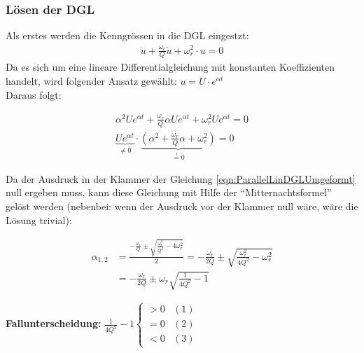 \subsubsection{Lösen der DGL}
Als erstes werden die Kenngrössen in die DGL eingestzt:
\begin{align}
\boxed{\ddot{u} + \frac{\omega_r}{Q}\dot{u} + \omega_r^2 \cdot u = 0}
\end{align}
Da es sich um eine lineare Differentialgleichung mit konstanten Koeffizienten
handelt, wird folgender Ansatz gewählt: $u = U \cdot e^{\alpha t}$ \\
Daraus folgt: 

\begin{align}
\alpha^2 U e^{\alpha t} + \frac{\omega_r}{Q}\alpha U e^{\alpha t} + \omega_r^2 U
e^{\alpha t} = 0 \nonumber \\
\underbrace{U e^{\alpha t}}_{\neq 0} \cdot \underbrace{\left(\alpha^2 +
\frac{\omega_r}{Q} \alpha + \omega_r^2\right)}_{\overset{!}{=} 0} = 0
\label{eqn:ParallelLinDGLUmgeformt}
\end{align}

Da der Ausdruck in der Klammer der Gleichung \ref{eqn:ParallelLinDGLUmgeformt}
null ergeben muss, kann diese Gleichung mit Hilfe der "`Mitternachtsformel"'
gelöst werden (nebenbei: wenn der Ausdruck vor der Klammer null wäre, wäre die
Lösung trivial):

\begin{align}
\alpha_{1,2} &= \frac{-\frac{\omega_r}{Q} \pm \sqrt{\frac{\omega_r^2}{Q^2} -
4\omega_r^2}}{2} = - \frac{\omega_r}{2Q} \pm \sqrt{\frac{\omega_r^2}{4Q^2} -
\omega_r^2} \nonumber \\
 &= -\frac{\omega_r}{2Q} \pm \omega_r \sqrt{\frac{1}{4Q^2} -1}
\end{align}

\textbf{Fallunterscheidung:} 
$\frac{1}{4Q^2} -1 \begin{cases}
 > 0 & (1)\\
 = 0 & (2) \\
 < 0 & (3)
\end{cases}$

